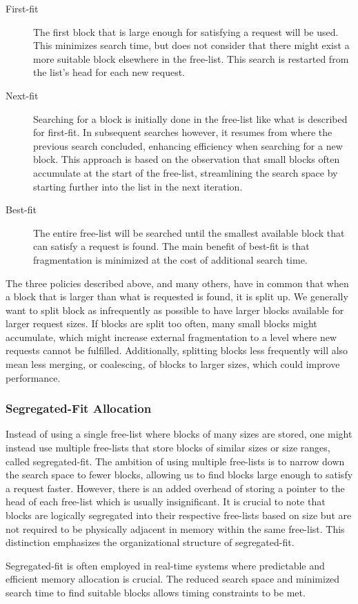 \begin{description}
    \item[First-fit]
        The first block that is large enough for satisfying a request will be used. This minimizes search time, but does not consider that there might exist a more suitable block elsewhere in the free-list. This search is restarted from the list's head for each new request. 
    \item[Next-fit]
        Searching for a block is initially done in the free-list like what is described for first-fit. In subsequent searches however, it resumes from where the previous search concluded, enhancing efficiency when searching for a new block. This approach is based on the observation that small blocks often accumulate at the start of the free-list, streamlining the search space by starting further into the list in the next iteration.
    \item[Best-fit]
        The entire free-list will be searched until the smallest available block that can satisfy a request is found. The main benefit of best-fit is that fragmentation is minimized at the cost of additional search time.
\end{description}

The three policies described above, and many others, have in common that when a block that is larger than what is requested is found, it is split up. We generally want to split block as infrequently as possible to have larger blocks available for larger request sizes. If blocks are split too often, many small blocks might accumulate, which might increase external fragmentation to a level where new requests cannot be fulfilled. Additionally, splitting blocks less frequently will also mean less merging, or coalescing, of blocks to larger sizes, which could improve performance.

\subsubsection{Segregated-Fit Allocation}
Instead of using a single free-list where blocks of many sizes are stored, one might instead use multiple free-lists that store blocks of similar sizes or size ranges, called segregated-fit. The ambition of using multiple free-lists is to narrow down the search space to fewer blocks, allowing us to find blocks large enough to satisfy a request faster. However, there is an added overhead of storing a pointer to the head of each free-list which is usually insignificant. It is crucial to note that blocks are logically segregated into their respective free-lists based on size but are not required to be physically adjacent in memory within the same free-list. This distinction emphasizes the organizational structure of segregated-fit.

Segregated-fit is often employed in real-time systems where predictable and efficient memory allocation is crucial. The reduced search space and minimized search time to find suitable blocks allows timing constraints to be met.


